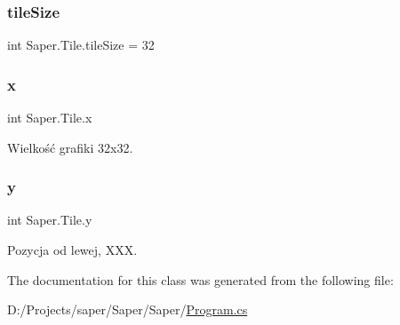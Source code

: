 \subsubsection{\texorpdfstring{tileSize}{tileSize}}
{\footnotesize\ttfamily int Saper.\+Tile.\+tile\+Size = 32}

\mbox{\label{class_saper_1_1_tile_a8861f08f0232b9e06b35f9539f97614e}} 
\subsubsection{\texorpdfstring{x}{x}}
{\footnotesize\ttfamily int Saper.\+Tile.\+x}



Wielkość grafiki 32x32. 

\mbox{\label{class_saper_1_1_tile_a4bee1eb877052349f14938b9d28eea87}} 
\subsubsection{\texorpdfstring{y}{y}}
{\footnotesize\ttfamily int Saper.\+Tile.\+y}



Pozycja od lewej, X\+XX. 



The documentation for this class was generated from the following file\+:\begin{DoxyCompactItemize}
\item 
D\+:/\+Projects/saper/\+Saper/\+Saper/\mbox{\hyperlink{_program_8cs}{Program.\+cs}}\end{DoxyCompactItemize}
